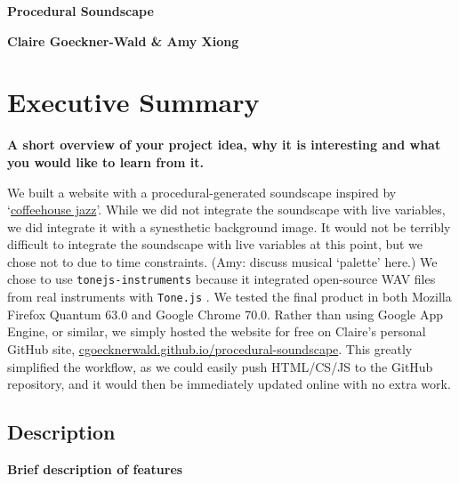 \documentclass[12pt,a4paper]{article}
\newcommand{\lightcode}[1]{\colorbox{light-gray}{\texttt{#1}}}
\begin{document}
\pagestyle{plain}
 

\begin{center}
{\LARGE{\bf
{{Procedural Soundscape}}
}}
\end{center}
\bigskip

\centerline{\bf{Claire Goeckner-Wald \& Amy Xiong}}

\bigskip

\tableofcontents


\section{Executive Summary}

\textbf{A short overview of your project idea, why it is interesting and what you would like to learn from it.}

We built a website with a procedural-generated soundscape inspired by `\href{https://www.youtube.com/watch?v=K2Q6YO3Ez44}{coffeehouse jazz}'. While we did not integrate the soundscape with live variables, we did integrate it with a synesthetic background image. It would not be terribly difficult to integrate the soundscape with live variables at this point, but we chose not to due to time constraints. (Amy: discuss musical `palette' here.) We chose to use \lightcode{tonejs-instruments} because it integrated open-source WAV files from real instruments with \lightcode{Tone.js} \cite{tonejs-instruments}. We tested the final product in both Mozilla Firefox Quantum 63.0 and Google Chrome 70.0. Rather than using Google App Engine, or similar, we simply hosted the website for free on Claire's personal GitHub site, \href{https://cgoecknerwald.github.io/procedural-soundscape}{cgoecknerwald.github.io/procedural-soundscape}. This greatly simplified the workflow, as we could easily push HTML/CS/JS to the GitHub repository, and it would then be immediately updated online with no extra work.

\subsection{Description}
\textbf{Brief description of features}
\end{document}
